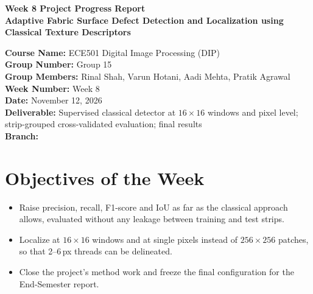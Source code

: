 \documentclass[11pt,a4paper]{article}
\newcommand{\code}[1]{\texttt{\detokenize{#1}}}
\begin{document}
\begin{center}
{\LARGE\bfseries Week 8 Project Progress Report}\\[4pt]
{\large\bfseries Adaptive Fabric Surface Defect Detection and Localization using\\ Classical Texture Descriptors}
\end{center}

\noindent
\textbf{Course Name:} ECE501 Digital Image Processing (DIP)\\
\textbf{Group Number:} Group 15\\
\textbf{Group Members:} Rinal Shah, Varun Hotani, Aadi Mehta, Pratik Agrawal\\
\textbf{Week Number:} Week 8\\
\textbf{Date:} November 12, 2026\\
\textbf{Deliverable:} Supervised classical detector at $16\times16$ windows and pixel level; strip-grouped cross-validated evaluation; final results\\
\textbf{Branch:} \code{feat/week-8}

\section*{Objectives of the Week}
\begin{itemize}
  \item Raise precision, recall, F1-score and IoU as far as the classical approach allows, evaluated without any leakage between training and test strips.
  \item Localize at $16\times16$ windows and at single pixels instead of $256\times256$ patches, so that 2--6\,px threads can be delineated.
  \item Close the project's method work and freeze the final configuration for the End-Semester report.
\end{itemize}
\end{document}
